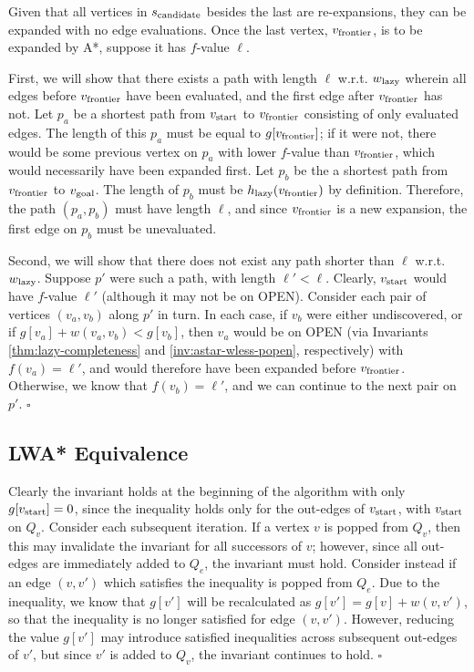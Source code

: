 \documentclass[nobib]{tufte-book}
\newcommand{\ms}[1]{\mbox{\scriptsize #1}}
\newenvironment{proof}[1][Proof]{\begin{trivlist}
   \item[\hskip \labelsep {\bfseries #1}]}{\hfill$\square$\end{trivlist}}
\begin{document}
\begin{proof}[Proof of Theorem \ref{thm:astar-equiv-to-lazy}]
Given that all vertices in $s_{\ms{candidate}}$ besides the last
are re-expansions,
they can be expanded with no edge evaluations.
Once the last vertex,
$v_{\ms{frontier}}$,
is to be expanded by A*,
suppose it has $f$-value $\ell$.

First,
we will show that there exists a path with length $\ell$ w.r.t.
$w_{\ms{lazy}}$
wherein all edges before $v_{\ms{frontier}}$ have been evaluated,
and the first edge after $v_{\ms{frontier}}$ has not.
Let $p_a$ be a shortest path from $v_{\ms{start}}$
to $v_{\ms{frontier}}$ consisting of only evaluated edges.
The length of this $p_a$ must be equal to $g[v_{\ms{frontier}}]$;
if it were not,
there would be some previous vertex on $p_a$ with lower $f$-value
than $v_{\ms{frontier}}$,
which would necessarily have been expanded first.
Let $p_b$ be the a shortest path from $v_{\ms{frontier}}$
to $v_{\ms{goal}}$.
The length of $p_b$ must be $h_{\ms{lazy}}(v_{\ms{frontier}})$
by definition.
Therefore, the path $(p_a, p_b)$ must have length $\ell$,
and since $v_{\ms{frontier}}$ is a new expansion,
the first edge on $p_b$ must be unevaluated.

Second,
we will show that there does not exist any path shorter than $\ell$
w.r.t. $w_{\ms{lazy}}$.
Suppose $p'$ were such a path, with length $\ell' < \ell$.
Clearly, $v_{\ms{start}}$ would have $f$-value $\ell'$ (although
it may not be on OPEN).
Consider each pair of vertices $(v_a, v_b)$ along $p'$ in turn.
In each case,
if $v_b$ were either undiscovered,
or if $g[v_a] + w(v_a, v_b) < g[v_b]$,
then $v_a$ would be on OPEN
(via Invariants \ref{thm:lazy-completeness}
and \ref{inv:astar-wless-popen}, respectively)
with $f(v_a) = \ell'$,
and would therefore have been expanded before $v_{\ms{frontier}}$.
Otherwise,
we know that $f(v_b) = \ell'$,
and we can continue to the next pair on $p'$.
\end{proof}

\subsection{LWA* Equivalence}

\begin{proof}[Proof of Invariant \ref{inv:lwastar}]
Clearly the invariant holds at the beginning of the algorithm
with only $g[v_{\ms{start}}] = 0$,
since the inequality holds only for the out-edges of $v_{\ms{start}}$,
with $v_{\ms{start}}$ on $Q_v$.
Consider each subsequent iteration.
If a vertex $v$ is popped from $Q_v$,
then this may invalidate the invariant for all successors of $v$;
however,
since all out-edges are immediately added to $Q_e$,
the invariant must hold.
Consider instead if an edge $(v, v')$ which satisfies the inequality
is popped from $Q_e$.
Due to the inequality,
we know that $g[v']$ will be recalculated as
$g[v'] = g[v] + w(v,v')$,
so that the inequality is no longer satisfied for edge $(v,v')$.
However,
reducing the value $g[v']$ may introduce satisfied inequalities across
subsequent out-edges of $v'$,
but since $v'$ is added to $Q_v$,
the invariant continues to hold.
\end{proof}
\end{document}
